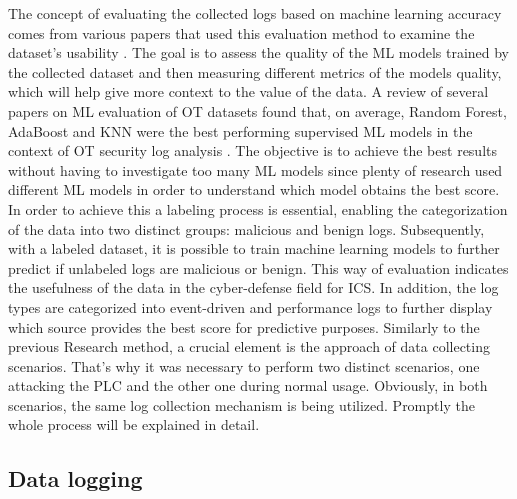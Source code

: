 \documentclass[Master,BMR,english]{twbook}
\begin{document}
The concept of evaluating the collected logs based on machine learning accuracy comes from various papers that used this evaluation method to examine the dataset's usability \cite{conti_survey_2021} \cite{dehlaghi-ghadim_icssim-framework_2023} \cite{borges_hink_machine_2014} \cite{nassif_machine_2021}. The goal is to assess the quality of the ML models trained by the collected dataset and then measuring different metrics of the models quality, which will help give more context to the value of the data. A review of several papers on ML evaluation of OT datasets found that, on average, Random Forest, AdaBoost and KNN were the best performing supervised ML models in the context of OT security log analysis \cite{nassif_machine_2021}\cite{conti_survey_2021}\cite{mubarak_industrial_2022}. The objective is to achieve the best results without having to investigate too many ML models since plenty of research used different ML models in order to understand which model obtains the best score. In order to achieve this a labeling process is essential, enabling the categorization of the data into two distinct groups: malicious and benign logs. Subsequently, with a labeled dataset, it is possible to train machine learning models to further predict if unlabeled logs are malicious or benign. This way of evaluation indicates the usefulness of the data in the cyber-defense field for ICS.  In addition, the log types are categorized into event-driven and performance logs to further display which source provides the best score for predictive purposes. Similarly to the previous Research method, a crucial element is the approach of data collecting scenarios. That’s why it was necessary to perform two distinct scenarios, one attacking the PLC and the other one during normal usage. Obviously, in both scenarios, the same log collection mechanism is being utilized. Promptly the whole process will be explained in detail\cite{log_based_malicious_detection}\cite{grover_anomaly_2018}. 

\subsection{Data logging}
\end{document}
